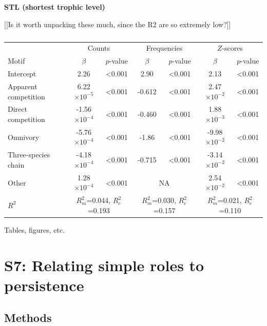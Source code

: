 \documentclass[12pt]{article}
\begin{document}
\begin{spacing}{2.0}
		\textbf{STL (shortest trophic level)}


			[[Is it worth unpacking these much, since the R2 are so extremely low?]]


			\begin{table}[h!]
			\caption{}
			\label{tab:motifs_vs_STL}
			\begin{tabular}{l | c c | c c | c c}
			& \multicolumn{2}{|c|}{Counts} & \multicolumn{2}{c}{Frequencies} & \multicolumn{2}{|c}{$Z$-scores} \\
			Motif & $\beta$ & $p$-value & $\beta$ & $p$-value & $\beta$ & $p$-value \\
			\hline
			Intercept & 2.26 & \textless0.001 & 2.90 & \textless0.001 & 2.13 & \textless0.001 \\
			\hline
			Apparent competition & 6.22$\times10^{-5}$ & \textless0.001 & -0.612 & \textless0.001 & 2.47$\times10^{-2}$ & \textless0.001 \\
			Direct competition   & -1.56$\times10^{-4}$ & \textless0.001 & -0.460 & \textless0.001 & 1.88$\times10^{-3}$ & \textless0.001 \\
			Omnivory       & -5.76$\times10^{-4}$ & \textless0.001 & -1.86 & \textless0.001 & -9.98$\times10^{-2}$ & \textless0.001 \\
			Three-species chain  & -4.18$\times10^{-4}$ & \textless0.001 & -0.715 & \textless0.001 & -3.14$\times10^{-2}$ & \textless0.001 \\
			Other    & 1.28$\times10^{-4}$ & \textless0.001 & \multicolumn{2}{c|}{NA} & 2.54$\times10^{-2}$ & \textless0.001 \\
			\hline
			$R^2$ & \multicolumn{2}{|c|}{$R^2_m$=0.044, $R^2_c$=0.193} & 
			\multicolumn{2}{c}{$R^2_m$=0.030, $R^2_c$=0.157} & 
			\multicolumn{2}{|c}{$R^2_m$=0.021, $R^2_c$=0.110} \\
			\end{tabular}
			\end{table}



		Tables, figures, etc.


\clearpage



\section*{S7: Relating simple roles to persistence}

	\subsection*{Methods}


\end{spacing}
\end{document}
